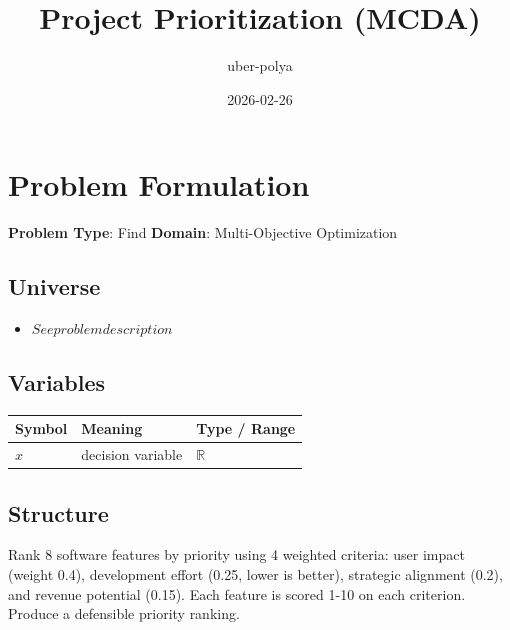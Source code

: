\documentclass[11pt, a4paper]{article}
\title{Project Prioritization (MCDA)}
\author{uber-polya}
\date{2026-02-26}
\begin{document}
\maketitle
\tableofcontents
\newpage

\section{Problem Formulation}

\begin{polyamodel}

\textbf{Problem Type}: Find \hfill
\textbf{Domain}: Multi-Objective Optimization


\end{polyamodel}

\subsection{Universe}

\begin{itemize}
  \item $See problem description$
\end{itemize}

\subsection{Variables}

\begin{longtable}{lll}
\toprule
\textbf{Symbol} & \textbf{Meaning} & \textbf{Type / Range} \\
\midrule
\endhead
$x$ & decision variable & $\mathbb{{R}}$ \\
\bottomrule
\end{longtable}

\subsection{Structure}

Rank 8 software features by priority using 4 weighted criteria: user impact
(weight 0.4), development effort (0.25, lower is better), strategic alignment
(0.2), and revenue potential (0.15). Each feature is scored 1-10 on each
criterion. Produce a defensible priority ranking.
\end{document}
